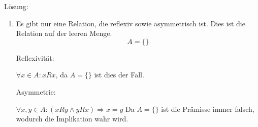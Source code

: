 \documentclass[main.tex]{subfiles}
\begin{document}
\begin{enumerate}
	      Lösung:
	      \begin{enumerate}
		      \item Es gibt nur eine Relation, die reflexiv sowie asymmetrisch ist. Dies ist die Relation
		            auf der leeren Menge.
		            \[ A = \{ \} \]

		            Reflexivität:

		            \( \forall x \in A: xRx \), da \( A = \{\} \) ist dies der Fall.

		            Asymmetrie:

		            \( \forall x,y \in A: (xRy \land yRx) \Rightarrow x = y\)
		            Da \( A = \{\} \) ist die Prämisse immer falsch, wodurch die Implikation wahr wird.
	      \end{enumerate}
\end{enumerate}
\end{document}
